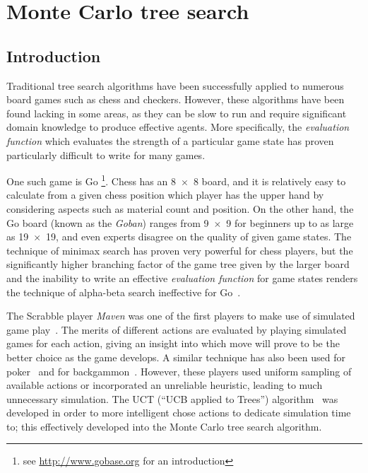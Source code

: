 \section{Monte Carlo tree search}

\subsection{Introduction}

Traditional tree search algorithms have been successfully applied to numerous board games such as chess and checkers.  However, these algorithms have been found lacking in some areas, as they can be slow to run and require significant domain knowledge to produce effective agents.  More specifically, the \emph{evaluation function} which evaluates the strength of a particular game state has proven particularly difficult to write for many games.

One such game is Go \footnote{see \url{http://www.gobase.org} for an introduction}.  Chess has an 8~$\times$~8 board, and it is relatively easy to calculate from a given chess position which player has the upper hand by considering aspects such as material count and position.  On the other hand, the Go board (known as the \emph{Goban}) ranges from 9~$\times$~9 for beginners up to as large as 19~$\times$~19, and even experts disagree on the quality of given game states.  The technique of minimax search \cite[p. 165]{RussellNorvig} has proven very powerful for chess players, but the significantly higher branching factor of the game tree given by the larger board and the inability to write an effective \emph{evaluation function} for game states renders the technique of alpha-beta search ineffective for Go~\citep{Gelly2006}.

The Scrabble player \emph{Maven} was one of the first players to make use of simulated game play~\citep{Sheppard2002}.  The merits of different actions are evaluated by playing simulated games for each action, giving an insight into which move will prove to be the better choice as the game develops.  A similar technique has also been used for poker~\citep{Billings2002} and for backgammon~\citep{Tesauro1996}.  However, these players used uniform sampling of available actions or incorporated an unreliable heuristic, leading to much unnecessary simulation.  The UCT (``UCB applied to Trees'') algorithm~\citep{Kocsis2006} was developed in order to more intelligent chose actions to dedicate simulation time to; this effectively developed into the Monte Carlo tree search algorithm.

